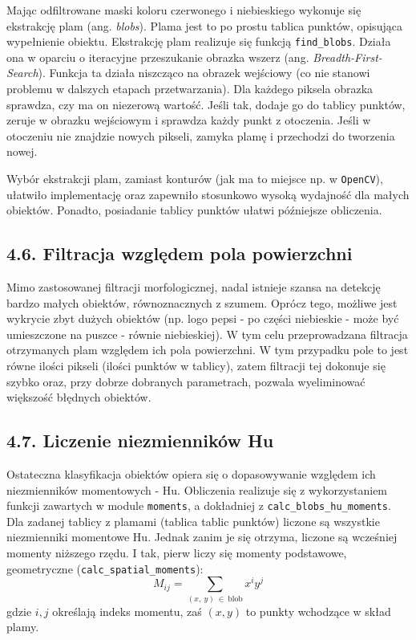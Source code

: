 \documentclass[11pt,a4paper,twoside]{report}
\begin{document}
			Mając odfiltrowane maski koloru czerwonego i niebieskiego wykonuje się ekstrakcję plam (ang. \emph{blobs}). Plama jest to po prostu tablica punktów, opisująca wypełnienie obiektu. Ekstrakcję plam realizuje się funkcją \texttt{find\_blobs}. Działa ona w oparciu o iteracyjne przeszukanie obrazka wszerz (ang. \emph{Breadth-First-Search}). Funkcja ta działa niszcząco na obrazek wejściowy (co nie stanowi problemu w dalszych etapach przetwarzania). Dla każdego piksela obrazka sprawdza, czy ma on niezerową wartość. Jeśli tak, dodaje go do tablicy punktów, zeruje w obrazku wejściowym i sprawdza każdy punkt z otoczenia. Jeśli w otoczeniu nie znajdzie nowych pikseli, zamyka plamę i przechodzi do tworzenia nowej.

			Wybór ekstrakcji plam, zamiast konturów (jak ma to miejsce np. w \texttt{OpenCV}), ułatwiło implementację oraz zapewniło stosunkowo wysoką wydajność dla małych obiektów. Ponadto, posiadanie tablicy punktów ułatwi późniejsze obliczenia.

	\subsection*{4.6. Filtracja względem pola powierzchni}

			Mimo zastosowanej filtracji morfologicznej, nadal istnieje szansa na detekcję bardzo małych obiektów, równoznacznych z szumem. Oprócz tego, możliwe jest wykrycie zbyt dużych obiektów (np. logo pepsi - po części niebieskie - może być umieszczone na puszce - równie niebieskiej). W tym celu przeprowadzana filtracja otrzymanych plam względem ich pola powierzchni. W tym przypadku pole to jest równe ilości pikseli (ilości punktów w tablicy), zatem filtracji tej dokonuje się szybko oraz, przy dobrze dobranych parametrach, pozwala wyeliminować większość błędnych obiektów.

	\subsection*{4.7. Liczenie niezmienników Hu}

			Ostateczna klasyfikacja obiektów opiera się o dopasowywanie względem ich niezmienników momentowych - Hu. Obliczenia realizuje się z wykorzystaniem funkcji zawartych w module \texttt{moments}, a dokładniej z \texttt{calc\_blobs\_hu\_moments}. Dla zadanej tablicy z plamami (tablica tablic punktów) liczone są wszystkie niezmienniki momentowe Hu. Jednak zanim je się otrzyma, liczone są wcześniej momenty niższego rzędu. I tak, pierw liczy się momenty podstawowe, geometryczne (\texttt{calc\_spatial\_moments}):
			\[
				M_{ij} = \sum_{(x,~y)~\in~\text{blob}} x^i y^j
			\]
			gdzie $i, j$ określają indeks momentu, zaś $(x, y)$ to punkty wchodzące w skład plamy.
\end{document}
